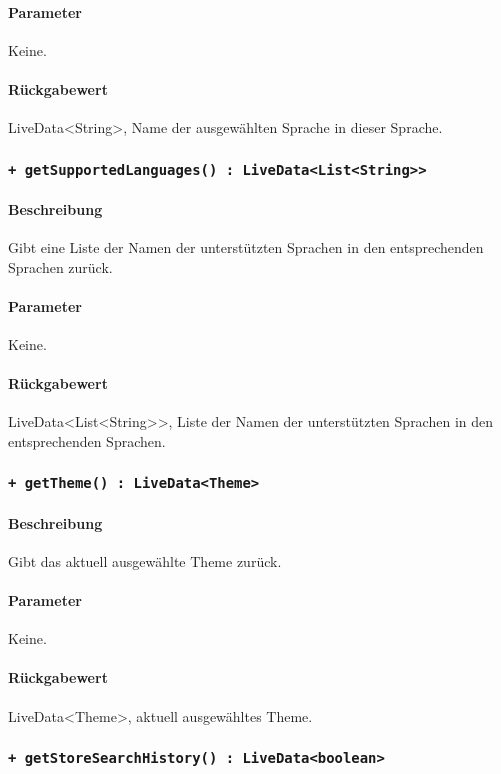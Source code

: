 \paragraph*{Parameter}
Keine.
\paragraph*{Rückgabewert}
LiveData<String>, Name der ausgewählten Sprache in dieser Sprache.

\subsubsection*{\texttt{+ getSupportedLanguages() : LiveData<List<String>>}}%
\paragraph*{Beschreibung}
Gibt eine Liste der Namen der unterstützten Sprachen in den entsprechenden Sprachen zurück.
\paragraph*{Parameter}
Keine.
\paragraph*{Rückgabewert}
LiveData<List<String>>, Liste der Namen der unterstützten Sprachen in den entsprechenden Sprachen.

\subsubsection*{\texttt{+ getTheme() : LiveData<Theme>}}%
\paragraph*{Beschreibung}
Gibt das aktuell ausgewählte Theme zurück.
\paragraph*{Parameter}
Keine.
\paragraph*{Rückgabewert}
LiveData<Theme>, aktuell ausgewähltes Theme.

\subsubsection*{\texttt{+ getStoreSearchHistory() : LiveData<boolean>}}%
